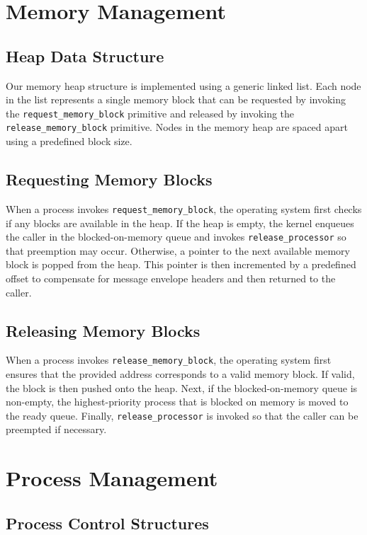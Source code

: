 \documentclass[12pt]{report}
\begin{document}
\section{Memory Management}

\subsection{Heap Data Structure}

Our memory heap structure is implemented using a generic linked list. Each node in the list represents a single memory block that can be requested by invoking the \texttt{request_memory_block} primitive and released by invoking the \texttt{release_memory_block} primitive. Nodes in the memory heap are spaced apart using a predefined block size.

\subsection{Requesting Memory Blocks}

When a process invokes \texttt{request_memory_block}, the operating system first checks if any blocks are available in the heap. If the heap is empty, the kernel enqueues the caller in the blocked-on-memory queue and invokes \texttt{release_processor} so that preemption may occur. Otherwise, a pointer to the next available memory block is popped from the heap. This pointer is then incremented by a predefined offset to compensate for message envelope headers and then returned to the caller.

\subsection{Releasing Memory Blocks}

When a process invokes \texttt{release_memory_block}, the operating system first ensures that the provided address corresponds to a valid memory block. If valid, the block is then pushed onto the heap. Next, if the blocked-on-memory queue is non-empty, the highest-priority process that is blocked on memory is moved to the ready queue. Finally, \texttt{release_processor} is invoked so that the caller can be preempted if necessary.

\section{Process Management}

\subsection{Process Control Structures}
\end{document}
